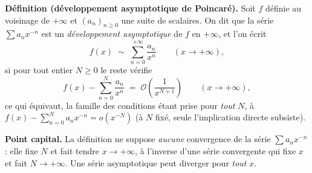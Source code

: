 



\begin{tcolorbox}[thmbox]
  \textbf{Définition (développement asymptotique de Poincaré).}%
  \enspace{}
  Soit $f$ définie au voisinage de $+\infty$ et $(a_n)_{n\geq 0}$ une suite de
  scalaires. On dit que la série $\sum a_n x^{-n}$ est un \emph{développement
  asymptotique} de $f$ en $+\infty$, et l'on écrit
  \[
    f(x) \;\sim\; \sum_{n=0}^{+\infty} \frac{a_n}{x^{n}}
    \qquad (x\to +\infty),
  \]
  si pour tout entier $N\geq 0$ le reste vérifie
  \[
    f(x) - \sum_{n=0}^{N} \frac{a_n}{x^{n}}
    \;=\; \mathcal{O}\!\left(\frac{1}{x^{N+1}}\right)
    \qquad (x\to +\infty),
  \]
  ce qui équivaut, la famille des conditions étant prise pour \emph{tout} $N$,
  à $f(x)-\sum_{n=0}^{N}a_n x^{-n}=o(x^{-N})$ (à $N$ fixé, seule l'implication
  directe subsiste).

  \medskip
  \textbf{Point capital.} La définition ne suppose \emph{aucune} convergence de
  la série $\sum a_n x^{-n}$ : elle fixe $N$ et fait tendre $x\to+\infty$, à
  l'inverse d'une série convergente qui fixe $x$ et fait $N\to+\infty$. Une série
  asymptotique peut diverger pour \emph{tout} $x$.


\end{tcolorbox}

